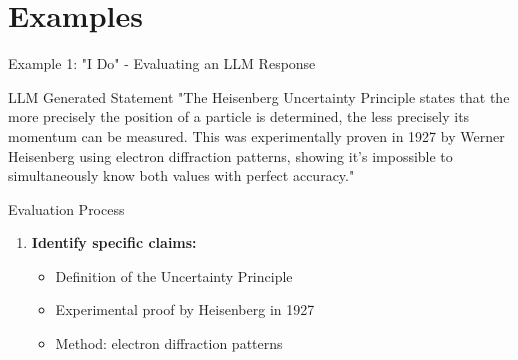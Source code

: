 \documentclass{beamer}
\begin{document}
\section{Examples}

\begin{frame}{Example 1: "I Do" - Evaluating an LLM Response}
\begin{block}{LLM Generated Statement}
"The Heisenberg Uncertainty Principle states that the more precisely the position of a particle is determined, the less precisely its momentum can be measured. This was experimentally proven in 1927 by Werner Heisenberg using electron diffraction patterns, showing it's impossible to simultaneously know both values with perfect accuracy."
\end{block}

\pause

\begin{block}{Evaluation Process}
\begin{enumerate}
  \item \textbf{Identify specific claims:}
  \begin{itemize}
    \item Definition of the Uncertainty Principle
    \item Experimental proof by Heisenberg in 1927
    \item Method: electron diffraction patterns
  \end{itemize}
\end{enumerate}
\end{block}
\end{frame}
\end{document}
